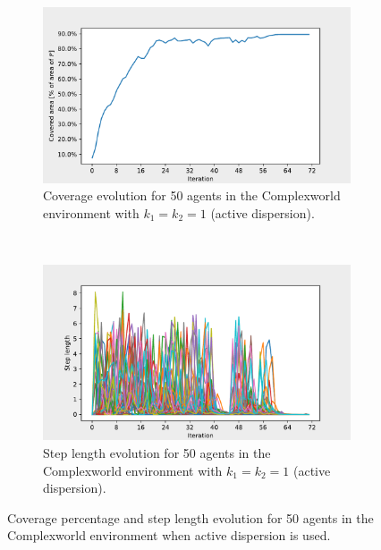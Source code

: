 \begin{figure}[H]
  \centering
  \begin{subfigure}[t]{0.5\textwidth}
    \centering
    \includegraphics[width=\textwidth]{figs/complexworld_50_agnt_k_1_1_k_2_1_area_traj.pdf}
    \caption{Coverage evolution for 50 agents in the Complexworld environment with $k_{1} = k_{2} = 1$ (active dispersion).}
    \label{fig:50_agnt_cw_k_1_k_2_1_a_traj}
  \end{subfigure}%
  ~ 
  \begin{subfigure}[t]{0.5\textwidth}
    \centering
    \includegraphics[width=\textwidth]{figs/complexworld_50_agnt_k_1_1_k_2_1_step_traj.pdf}
    \caption{Step length evolution for 50 agents in the Complexworld environment with $k_{1} = k_{2} = 1$ (active dispersion).}
    \label{fig:50_agnt_cw_k_1_1_k_2_1_s_traj}
  \end{subfigure}
  \caption{Coverage percentage and step length evolution for 50 agents in the Complexworld environment when active dispersion is used.}
  \label{fig:50_agnt_tw_evolution_active}
\end{figure}
